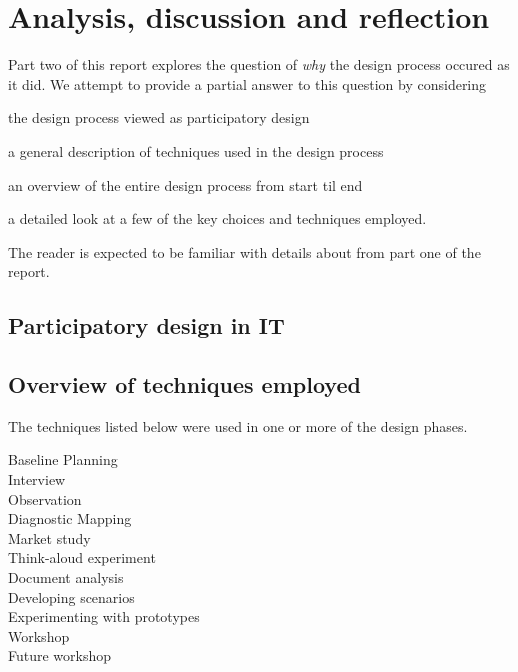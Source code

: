 \section{Analysis, discussion and reflection}

Part two of this report explores the question of \textit{why}
the design process occured as it did. We attempt to provide a
partial answer to this question by considering
\begin{inparaenum}[1)]
\item the design process viewed as participatory design
\item a general description of techniques used in the design process
\item an overview of the entire design process from start til end
\item a detailed look at a few of the key choices and techniques employed.
\end{inparaenum}

The reader is expected to be familiar with details about \gomonkey 
from part one of the report.

\subsection{Participatory design in IT}

\subsection{Overview of techniques employed}

The techniques listed below were used in one or more of the design phases.
\begin{description}
    \item [Baseline Planning]
    \item [Interview]
    \item [Observation]
    \item [Diagnostic Mapping]
    \item [Market study]
    \item [Think-aloud experiment]
    \item [Document analysis]
    \item [Developing scenarios]
    \item [Experimenting with prototypes]
    \item [Workshop]
    \item [Future workshop]
\end{description}


